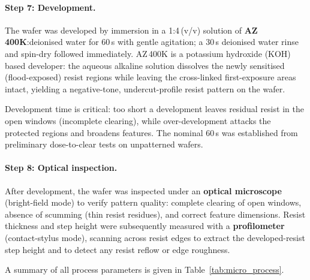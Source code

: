 \paragraph{Step 7: Development.}
The wafer was developed by immersion in a 1:4\,(v/v) solution of
\textbf{AZ\,400K}:deionised water for 60\,s with gentle agitation; a 30\,s
deionised water rinse and spin-dry followed immediately. AZ\,400K is a potassium
hydroxide (KOH) based developer: the aqueous alkaline solution
dissolves the newly
sensitised (flood-exposed) resist regions while leaving the cross-linked
first-exposure areas intact, yielding a negative-tone, undercut-profile resist
pattern on the wafer.

Development time is critical: too short a development leaves residual
resist in the
open windows (incomplete clearing), while over-development attacks the protected
regions and broadens features. The nominal 60\,s was established from
preliminary
dose-to-clear tests on unpatterned wafers.

\paragraph{Step 8: Optical inspection.}
After development, the wafer was inspected under an \textbf{optical microscope}
(bright-field mode) to verify pattern quality: complete clearing of
open windows,
absence of scumming (thin resist residues), and correct feature
dimensions. Resist
thickness and step height were subsequently measured with a
\textbf{profilometer}
(contact-stylus mode), scanning across resist edges to extract the
developed-resist
step height and to detect any resist reflow or edge roughness.

A summary of all process parameters is given in Table~\ref{tab:micro_process}.

